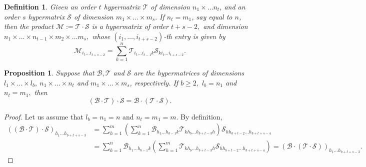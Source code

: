 \documentclass[10pt,a4paper]{article}
\newtheorem{proposition}{Proposition}[section]
\newtheorem{definition}{Definition}[section]
\begin{document}
	
	\begin{definition}\label{product_dot}
		Given an order $t$ hypermatrix $\mathcal{T}$ of dimension $n_1 \times \ldots n_{t}$, and an order $s$ hypermatrix $\mathcal{S}$ of dimension $m_1 \times \ldots \times m_s.$ If $n_t=m_1$, say equal to $n$, then the product $\mathcal{M} := \mathcal{T} \cdot \mathcal{S}$ is a hypermatrix of order $t+s-2,$ and dimension $n_1 \times \ldots \times n_{t-1} \times m_2 \times \ldots m_s, $ whose $(i_1,\ldots,i_{t+s-2})$-th entry is given by 
		\begin{equation*}
			\mathcal{M}_{i_1\ldots i_{t+s-2}} = \sum\limits_{k=1}^n \mathcal{T}_{i_1 \ldots i_{t-1}k} \mathcal{S}_{ki_{t} \ldots i_{t+s-2}}.
		\end{equation*}
	\end{definition}
	
	
	
	\begin{proposition}
		Suppose that $\mathcal{B}, \mathcal{T} $ and $ \mathcal{S} $ are the hypermatrices of dimensions $l_1 \times \ldots \times l_b, ~ n_1 \times \ldots \times n_t$ and $m_1 \times \ldots \times m_s$, respectively.
		If $b \geq 2,$  $l_b = n_1$ and $n_t = m_1,$ then 
		$$(\mathcal{B} \cdot \mathcal{T}) \cdot \mathcal{S} = \mathcal{B} \cdot (\mathcal{T} \cdot \mathcal{S}).$$
	\end{proposition}
	\begin{proof}
		Let us assume that $l_b = n_1=n$ and $n_t = m_1=m.$ By definition,
		\begin{align*}
			((\mathcal{B} \cdot \mathcal{T}) \cdot \mathcal{S})_{h_1\ldots h_{b+t+s-3}}
			&=  \sum\limits_{h=1}^m \left( \sum\limits_{k=1}^n \mathcal{B}_{h_1 \ldots h_{b-1}k} \mathcal{T}_{k h_b \ldots h_{b+t-3}h}  \right) \mathcal{S}_{h h_{b+t-2} \ldots h_{b+t+s-4}} \\
			&= \sum\limits_{k=1}^n \mathcal{B}_{h_1 \ldots h_{b-1}k} \left( \sum\limits_{h=1}^m \mathcal{T}_{k h_b \ldots h_{b+t-3}h}   \mathcal{S}_{h h_{b+t-2} \ldots h_{b+t+s-4}} \right)
			= (\mathcal{B} \cdot (\mathcal{T} \cdot \mathcal{S}))_{h_1\ldots h_{b+t+s-3}}.
		\end{align*}
	\end{proof}
	
\end{document}
